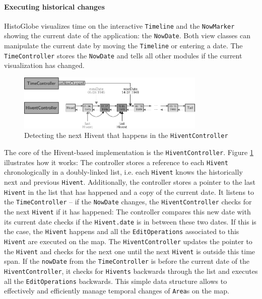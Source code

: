 
\paragraph{Executing historical changes} %
\label{par:executing_historical_changes}

HistoGlobe visualizes time on the interactive \texttt{Timeline} and the \texttt{NowMarker} showing the current date of the application: the \texttt{NowDate}. Both view classes can manipulate the current date by moving the \texttt{Timeline} or entering a date. The \texttt{TimeController} stores the \texttt{NowDate} and tells all other modules if the current visualization has changed.

\begin{figure}[ht]
  \vspace{1em}
  \centering
  \includegraphics[width=0.8\textwidth]{graphics/development/application/hivent_controller}
  \caption{Detecting the next Hivent that happens in the \texttt{HiventController}}
  \label{fig:hivent_controller}
\end{figure}

The core of the Hivent-based implementation is the \texttt{HiventController}. Figure \ref{fig:hivent_controller} illustrates how it works: The controller stores a reference to each \texttt{Hivent} chronologically in a doubly-linked list, i.e. each \texttt{Hivent} knows the historically next and previous \texttt{Hivent}. Additionally, the controller stores a pointer to the last \texttt{Hivent} in the list that has happened and a copy of the current date. It listens to the \texttt{TimeController} -- if the \texttt{NowDate} changes, the \texttt{HiventController} checks for the next \texttt{Hivent} if it has happened: The controller compares this new date with its current date checks if the \texttt{Hivent.date} is in between these two dates. If this is the case, the \texttt{Hivent} happens and all the \texttt{EditOperations} associated to this \texttt{Hivent} are executed on the map. The \texttt{HiventController} updates the pointer to the \texttt{Hivent} and checks for the next one until the next \texttt{Hivent} is outside this time span. If the \texttt{nowDate} from the \texttt{TimeController} is before the current date of the \texttt{HiventController}, it checks for \texttt{Hivents} backwards through the list and executes all the \texttt{EditOperations} backwards. This simple data structure allows to effectively and efficiently manage temporal changes of \texttt{Area}s on the map.


